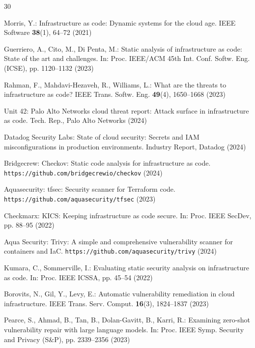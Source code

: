 \documentclass[runningheads]{llncs}
\begin{document}
%
%
\begin{thebibliography}{30}
\providecommand{\url}[1]{\texttt{#1}}
\providecommand{\urlprefix}{URL }
\providecommand{\doi}[1]{https://doi.org/#1}

Morris, Y.: Infrastructure as code: Dynamic systems for the cloud age. IEEE Software \textbf{38}(1), 64--72 (2021)

Guerriero, A., Cito, M., Di Penta, M.: Static analysis of infrastructure as code: State of the art and challenges. In: Proc. IEEE/ACM 45th Int. Conf. Softw. Eng. (ICSE), pp. 1120--1132 (2023)

Rahman, F., Mahdavi-Hezaveh, R., Williams, L.: What are the threats to infrastructure as code? IEEE Trans. Softw. Eng. \textbf{49}(4), 1650--1668 (2023)

Unit 42: Palo Alto Networks cloud threat report: Attack surface in infrastructure as code. Tech. Rep., Palo Alto Networks (2024)

Datadog Security Labs: State of cloud security: Secrets and IAM misconfigurations in production environments. Industry Report, Datadog (2024)

Bridgecrew: Checkov: Static code analysis for infrastructure as code. \url{https://github.com/bridgecrewio/checkov} (2024)

Aquasecurity: tfsec: Security scanner for Terraform code. \url{https://github.com/aquasecurity/tfsec} (2023)

Checkmarx: KICS: Keeping infrastructure as code secure. In: Proc. IEEE SecDev, pp. 88--95 (2022)

Aqua Security: Trivy: A simple and comprehensive vulnerability scanner for containers and IaC. \url{https://github.com/aquasecurity/trivy} (2024)

Kumara, C., Sommerville, I.: Evaluating static security analysis on infrastructure as code. In: Proc. IEEE ICSSA, pp. 45--54 (2022)

Borovits, N., Gil, Y., Levy, E.: Automatic vulnerability remediation in cloud infrastructure. IEEE Trans. Serv. Comput. \textbf{16}(3), 1824--1837 (2023)

Pearce, S., Ahmad, B., Tan, B., Dolan-Gavitt, B., Karri, R.: Examining zero-shot vulnerability repair with large language models. In: Proc. IEEE Symp. Security and Privacy (S\&P), pp. 2339--2356 (2023)


\end{thebibliography}
\end{document}
